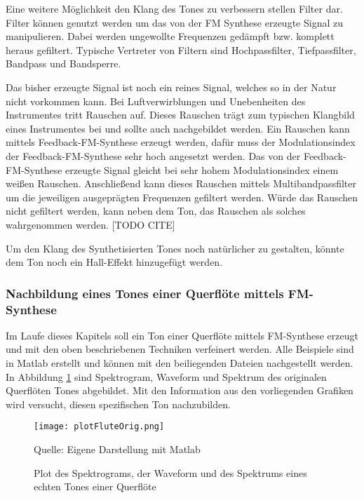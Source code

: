 Eine weitere Möglichkeit den Klang des Tones zu verbessern stellen Filter dar. Filter können genutzt werden um das von der FM Synthese erzeugte Signal zu manipulieren. Dabei werden ungewollte Frequenzen gedämpft bzw. komplett heraus gefiltert. Typische Vertreter von Filtern sind Hochpassfilter, Tiefpassfilter, Bandpass und Bandsperre. \cite[S. 100-104]{stotz}

Das bisher erzeugte Signal ist noch ein reines Signal, welches so in der Natur nicht vorkommen kann. Bei Luftverwirblungen und Unebenheiten des Instrumentes tritt Rauschen auf. Dieses Rauschen trägt zum typischen Klangbild eines Instrumentes bei und sollte auch nachgebildet werden. Ein Rauschen kann mittels Feedback-FM-Synthese erzeugt werden, dafür muss der Modulationsindex der Feedback-FM-Synthese sehr hoch angesetzt werden. Das von der Feedback-FM-Synthese erzeugte Signal gleicht bei sehr hohem Modulationsindex einem weißen Rauschen. Anschließend kann dieses Rauschen mittels Multibandpassfilter um die jeweiligen ausgeprägten Frequenzen gefiltert werden. Würde das Rauschen nicht gefiltert werden, kann neben dem Ton, das Rauschen als solches wahrgenommen werden. [TODO CITE]

Um den Klang des Synthetisierten Tones noch natürlicher zu gestalten, könnte dem Ton noch ein Hall-Effekt hinzugefügt werden.


\FloatBarrier
\subsubsection{Nachbildung eines Tones einer Querflöte mittels FM-Synthese}

Im Laufe dieses Kapitels soll ein Ton einer Querflöte mittels FM-Synthese erzeugt und mit den oben beschriebenen Techniken verfeinert werden. Alle Beispiele sind in Matlab erstellt und können mit den beiliegenden Dateien nachgestellt werden. In Abbildung \ref{fig:plotFluteOrig} sind Spektrogram, Waveform und Spektrum des originalen Querflöten Tones abgebildet. Mit den Information aus den vorliegenden Grafiken wird versucht, diesen spezifischen Ton nachzubilden.

\begin{figure} [h!t!b!]
\centering
  \texttt{[image: plotFluteOrig.png]}
\caption{Plot des Spektrograms, der Waveform und des Spektrums eines echten Tones einer Querflöte}
\label{fig:plotFluteOrig}
Quelle: Eigene Darstellung mit Matlab
\end{figure}

